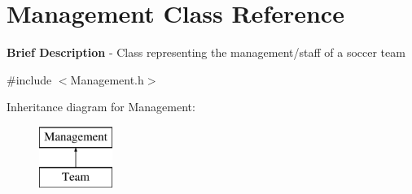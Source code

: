 \hypertarget{class_management}{\section{Management Class Reference}
\label{class_management}
}


{\bfseries Brief Description} -\/ Class representing the management/staff of a soccer team  




{\ttfamily \#include $<$Management.\-h$>$}

Inheritance diagram for Management\-:\begin{figure}[H]
\begin{center}
\leavevmode
\includegraphics[height=2.000000cm]{class_management}
\end{center}
\end{figure}
